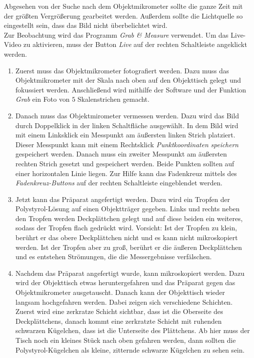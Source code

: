 Abgesehen von der Suche nach dem Objektmikrometer sollte die ganze Zeit mit der größten Vergrößerung gearbeitet werden. Außerdem sollte die Lichtquelle so eingestellt sein, dass das Bild nicht überbelichtet wird. \\
Zur Beobachtung wird das Programm \emph{Grab \& Measure} verwendet. Um das Live-Video zu aktivieren, muss der Button \emph{Live} auf der rechten Schaltleiste angeklickt werden.

\begin{enumerate}

  \item Zuerst muss das Objektmikrometer fotografiert werden. Dazu muss das Objektmikrometer mit der Skala nach oben auf den Objekttisch gelegt und fokussiert werden. Anschließend wird mithilfe der Software und der Funktion \emph{Grab} ein Foto von $5$ Skalenstrichen gemacht.

  \item Danach muss das Objektmirometer vermessen werden. Dazu wird das Bild durch Doppelklick in der linken Schaltfläche ausgewählt. In dem Bild wird mit einem Linksklick ein Messpunkt am äußersten linken Strich platziert. Dieser Messpunkt kann mit einem Rechtsklick \emph{Punktkoordinaten speichern} gespeichert werden. Danach muss ein zweiter Messpunkt am äußersten rechten Strich gesetzt und gespeichert werden. Beide Punkten sollten auf einer horizontalen Linie liegen. Zur Hilfe kann das Fadenkreuz mittels des \emph{Fadenkreuz-Buttons} auf der rechten Schaltleiste eingeblendet werden.


  \item Jetzt kann das Präparat angefertigt werden. Dazu wird ein Tropfen der Polystyrol-Lösung auf einen Objektträger gegeben. Links und rechts neben den Tropfen werden Deckplättchen gelegt und auf diese beiden ein weiteres, sodass der Tropfen flach gedrückt wird. Vorsicht: Ist der Tropfen zu klein, berührt er das obere Deckplättchen nicht und es kann nicht mikroskopiert werden. Ist der Tropfen aber zu groß, berührt er die äußeren Deckplättchen und es entstehen Strömungen, die die Messergebnisse verfälschen.

  \item Nachdem das Präparat angefertigt wurde, kann mikroskopiert werden. Dazu wird der Objekttisch etwas heruntergefahren und das Präparat gegen das Objektmikrometer ausgetauscht. Danach kann der Objekttisch wieder langsam hochgefahren werden. Dabei zeigen sich verschiedene Schichten. Zuerst wird eine zerkratze Schicht sichtbar, dass ist die Oberseite des Deckplättchens, danach kommt eine zerkratzte Schicht mit ruhenden schwarzen Kügelchen, dass ist die Unterseite des Plättchens. Ab hier muss der Tisch noch ein kleines Stück nach oben gefahren werden, dann sollten die Polystyrol-Kügelchen als kleine, zitternde schwarze Kügelchen zu sehen sein.


\end{enumerate}
